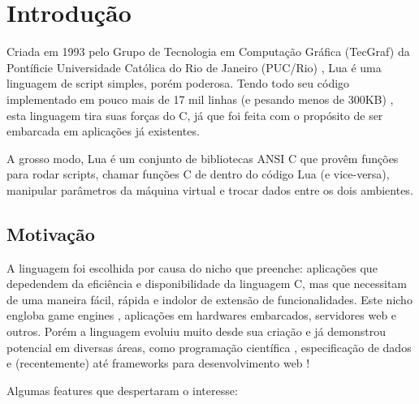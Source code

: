 \documentclass[a4paper,12pt]{abnt}
\begin{document}

\folhaderosto
\sumario



\chapter{Introdução}

Criada em 1993 pelo Grupo de Tecnologia em Computação Gráfica (TecGraf) da
Pontíficie Universidade Católica do Rio de Janeiro (PUC/Rio) \cite{luaabout},
Lua é uma linguagem de script simples, porém poderosa.
Tendo todo seu código implementado em pouco mais de
17 mil linhas (e pesando menos de 300KB) \cite{luaabout}, esta linguagem
tira suas forças do C, já que foi feita com o propósito de ser embarcada
em aplicações já existentes.

A grosso modo, Lua é um conjunto de bibliotecas ANSI C que provêm
funções para rodar scripts, chamar funções C de dentro
do código Lua (e vice-versa), manipular parâmetros da máquina virtual
e trocar dados entre os dois ambientes.

\section{Motivação}

A linguagem foi escolhida por causa do nicho que preenche:
aplicações que depedendem da eficiência e disponibilidade da linguagem C,
mas que necessitam de uma maneira fácil, rápida e indolor de extensão de
funcionalidades. Este nicho engloba game engines \cite{luascript},
aplicações em hardwares embarcados, servidores web e outros.
Porém a linguagem evoluiu muito desde sua criação e já
demonstrou potencial em diversas áreas, como programação científica \cite{luacient},
especificação de dados e (recentemente) até frameworks
para desenvolvimento web \cite{luaweb} !

Algumas features que despertaram o interesse:
\end{document}
